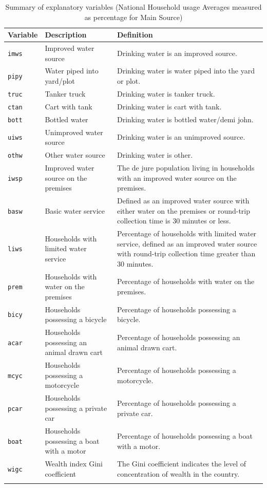 \documentclass[10pt,twoside]{article}
\numberwithin{equation}{section}
\newcommand{\?}{\stackrel{?}{=}}
\begin{document}
\begin{table}[h!]
  \centering
  \begin{tabular}{p{1in} p{3in} p{2in}}\toprule
    \bf Variable & \bf Description & \bf Definition \\\midrule
    \texttt{imws} & Improved water source
 & Drinking water is an improved source.
 \\\midrule
  \texttt{pipy} & Water piped into yard/plot
& Drinking water is water piped into the yard or plot.
\\\midrule
 \texttt{truc} & Tanker truck & Drinking water is tanker truck.
\\\midrule
 \texttt{ctan} & Cart with tank & Drinking water is cart with tank.
\\\midrule
 \texttt{bott} & Bottled water & Drinking water is bottled water/demi john.
\\\midrule
 \texttt{uiws} & Unimproved water source & Drinking water is an unimproved source.
\\\midrule
 \texttt{othw} & Other water source & Drinking water is other.
\\\midrule
 \texttt{iwsp} & Improved water source on the premises & The de jure population living in households with an improved water source on the premises.
\\\midrule
 \texttt{basw} & Basic water service
 & Defined as an improved water source with either water on the premises or round-trip collection time is 30 minutes or less.
\\\midrule
 \texttt{liws} & Households with limited water service
 & Percentage of households with limited water service, defined as an improved water source with round-trip collection time greater than 30 minutes.
\\\midrule
 \texttt{prem} & Households with water on the premises
 & Percentage of households with water on the premises.
\\\midrule
 \texttt{bicy} & Households possessing a bicycle
 & Percentage of households possessing a bicycle.
\\\midrule
 \texttt{acar} & Households possessing an animal drawn cart
 & Percentage of households possessing an animal drawn cart.
\\\midrule
 \texttt{mcyc} & Households possessing a motorcycle
 & Percentage of households possessing a motorcycle.
\\\midrule
 \texttt{pcar} & Households possessing a private car
 & Percentage of households possessing a private car.
\\\midrule
 \texttt{boat} & Households possessing a boat with a motor
 & Percentage of households possessing a boat with a motor.
\\\midrule
 \texttt{wigc} & Wealth index Gini coefficient
 & The Gini coefficient indicates the level of concentration of wealth in the country.
\\\midrule
 & \\\bottomrule
  \end{tabular}
  \caption{Summary of explanatory variables (National Household usage Averages measured as percentage for Main Source)}
  \label{tab:summary-var}
\end{table}
\end{document}
